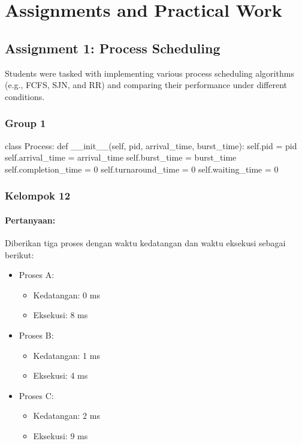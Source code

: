 \documentclass[12pt]{article}
\begin{document}
\section{Assignments and Practical Work}
\subsection{Assignment 1: Process Scheduling}
Students were tasked with implementing various process scheduling algorithms (e.g., FCFS, SJN, and RR) and comparing their performance under different conditions.
\subsubsection{Group 1}
\begin{python}
    class Process:
    def __init__(self, pid, arrival_time, burst_time):
        self.pid = pid
        self.arrival_time = arrival_time
        self.burst_time = burst_time
        self.completion_time = 0
        self.turnaround_time = 0
        self.waiting_time = 0
\end{python}

\subsubsection{Kelompok 12}

\paragraph{Pertanyaan:}Diberikan tiga proses dengan waktu kedatangan dan waktu eksekusi sebagai berikut:

\begin{itemize}
    \item Proses A:
    \begin{itemize}
        \item Kedatangan: 0 ms
        \item Eksekusi: 8 ms
    \end{itemize}
    \item Proses B:
    \begin{itemize}
        \item Kedatangan: 1 ms
        \item Eksekusi: 4 ms
    \end{itemize}
    \item Proses C:
    \begin{itemize}
        \item Kedatangan: 2 ms
        \item Eksekusi: 9 ms
    \end{itemize}
\end{itemize}
\end{document}
